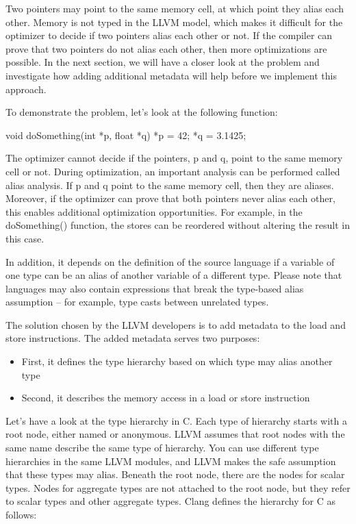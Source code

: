
Two pointers may point to the same memory cell, at which point they alias each other. Memory is not typed in the LLVM model, which makes it difficult for the optimizer to decide if two pointers alias each other or not. If the compiler can prove that two pointers do not alias each other, then more optimizations are possible. In the next section, we will have a closer look at the problem and investigate how adding additional metadata will help before we implement this approach.


To demonstrate the problem, let’s look at the following function:

\begin{cpp}
void doSomething(int *p, float *q) {
    *p = 42;
    *q = 3.1425;
}
\end{cpp}

The optimizer cannot decide if the pointers, p and q, point to the same memory cell or not. During optimization, an important analysis can be performed called alias analysis. If p and q point to the same memory cell, then they are aliases. Moreover, if the optimizer can prove that both pointers never alias each other, this enables additional optimization opportunities. For example, in the doSomething() function, the stores can be reordered without altering the result in this case.

In addition, it depends on the definition of the source language if a variable of one type can be an alias of another variable of a different type. Please note that languages may also contain expressions that break the type-based alias assumption – for example, type casts between unrelated types.

The solution chosen by the LLVM developers is to add metadata to the load and store instructions. The added metadata serves two purposes:

\begin{itemize}
\item
First, it defines the type hierarchy based on which type may alias another type

\item
Second, it describes the memory access in a load or store instruction
\end{itemize}

Let’s have a look at the type hierarchy in C. Each type of hierarchy starts with a root node, either named or anonymous. LLVM assumes that root nodes with the same name describe the same type of hierarchy. You can use different type hierarchies in the same LLVM modules, and LLVM makes the safe assumption that these types may alias. Beneath the root node, there are the nodes for scalar types. Nodes for aggregate types are not attached to the root node, but they refer to scalar types and other aggregate types. Clang defines the hierarchy for C as follows:

